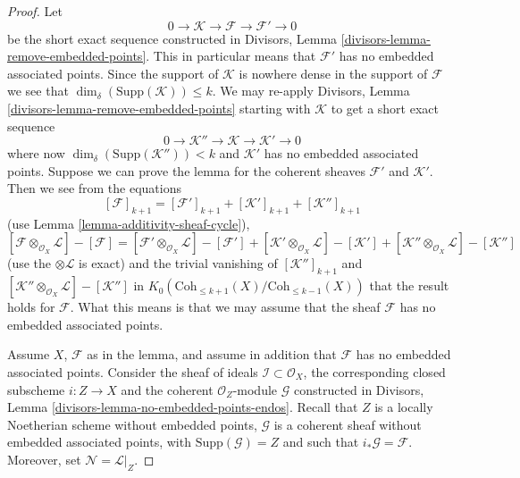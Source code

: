 \begin{proof}
Let
$$
0 \to \mathcal{K} \to \mathcal{F} \to \mathcal{F}' \to 0
$$
be the short exact sequence constructed in
Divisors, Lemma \ref{divisors-lemma-remove-embedded-points}.
This in particular means that $\mathcal{F}'$ has no embedded
associated points.
Since the support of $\mathcal{K}$ is nowhere dense in the
support of $\mathcal{F}$ we see that
$\dim_\delta(\text{Supp}(\mathcal{K})) \leq k$. We may
re-apply
Divisors, Lemma \ref{divisors-lemma-remove-embedded-points}
starting with $\mathcal{K}$ to get a short exact sequence
$$
0 \to \mathcal{K}'' \to \mathcal{K} \to \mathcal{K}' \to 0
$$
where now $\dim_\delta(\text{Supp}(\mathcal{K}'')) < k$
and $\mathcal{K}'$ has no embedded associated points.
Suppose we can prove the lemma for the coherent sheaves
$\mathcal{F}'$ and $\mathcal{K}'$. Then we see
from the equations
$$
[\mathcal{F}]_{k + 1}
=
[\mathcal{F}']_{k + 1}
+ [\mathcal{K}']_{k + 1}
+ [\mathcal{K}'']_{k + 1}
$$
(use Lemma \ref{lemma-additivity-sheaf-cycle}),
$$
[\mathcal{F} \otimes_{\mathcal{O}_X} \mathcal{L}]
-
[\mathcal{F}]
=
[\mathcal{F}' \otimes_{\mathcal{O}_X} \mathcal{L}]
-
[\mathcal{F}']
+
[\mathcal{K}' \otimes_{\mathcal{O}_X} \mathcal{L}]
-
[\mathcal{K}']
+
[\mathcal{K}'' \otimes_{\mathcal{O}_X} \mathcal{L}]
-
[\mathcal{K}'']
$$
(use the $\otimes \mathcal{L}$ is exact)
and the trivial vanishing of $[\mathcal{K}'']_{k + 1}$ and
$[\mathcal{K}'' \otimes_{\mathcal{O}_X} \mathcal{L}]
- [\mathcal{K}'']$ in
$K_0(\text{Coh}_{\leq k + 1}(X)/\text{Coh}_{\leq k - 1}(X))$
that the result holds
for $\mathcal{F}$. What this means is that we may assume that
the sheaf $\mathcal{F}$ has no embedded associated points.

\medskip\noindent
Assume $X$, $\mathcal{F}$ as in the lemma, and assume in addition
that $\mathcal{F}$ has no embedded associated points. Consider the
sheaf of ideals $\mathcal{I} \subset \mathcal{O}_X$, the corresponding
closed subscheme $i : Z \to X$ and the coherent $\mathcal{O}_Z$-module
$\mathcal{G}$ constructed in
Divisors, Lemma \ref{divisors-lemma-no-embedded-points-endos}.
Recall that $Z$ is a locally Noetherian scheme without embedded points,
$\mathcal{G}$ is a coherent sheaf without embedded
associated points, with $\text{Supp}(\mathcal{G}) = Z$
and such that $i_*\mathcal{G} = \mathcal{F}$.
Moreover, set $\mathcal{N} = \mathcal{L}|_Z$.


\end{proof}
